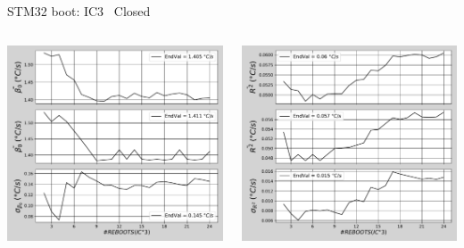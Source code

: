 \begin{frame}{STM32 boot: IC3 \textrightarrow\ Closed}
	\vspace{5mm}
	\begin{columns}
		\begin{column}{0.5\textwidth}
			\includegraphics[width=1.0\textwidth]{./figures/flistCircuit3_25_sl30beta0.pdf}
		\end{column}
		\begin{column}{0.5\textwidth}
			\includegraphics[width=1.0\textwidth]{./figures/flistCircuit3_25_sl30r2.pdf}
		\end{column}
	\end{columns}
\end{frame}

